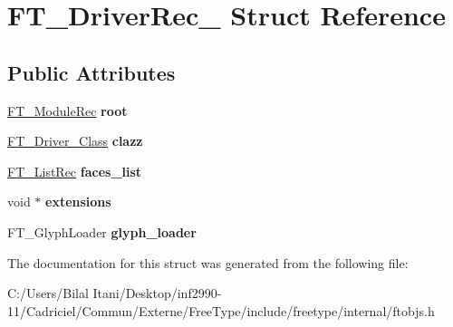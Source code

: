 \hypertarget{struct_f_t___driver_rec__}{}\section{F\+T\+\_\+\+Driver\+Rec\+\_\+ Struct Reference}
\label{struct_f_t___driver_rec__}
\subsection*{Public Attributes}
\begin{DoxyCompactItemize}
\item 
\hyperlink{struct_f_t___module_rec__}{F\+T\+\_\+\+Module\+Rec} {\bfseries root}\hypertarget{struct_f_t___driver_rec___a8451ceb25c76794fb47e81f477c8222d}{}\label{struct_f_t___driver_rec___a8451ceb25c76794fb47e81f477c8222d}

\item 
\hyperlink{struct_f_t___driver___class_rec__}{F\+T\+\_\+\+Driver\+\_\+\+Class} {\bfseries clazz}\hypertarget{struct_f_t___driver_rec___a3111153608e5abeb093ed5eb7fef5aec}{}\label{struct_f_t___driver_rec___a3111153608e5abeb093ed5eb7fef5aec}

\item 
\hyperlink{struct_f_t___list_rec__}{F\+T\+\_\+\+List\+Rec} {\bfseries faces\+\_\+list}\hypertarget{struct_f_t___driver_rec___a2602170e3ecde21a764dc32417aaa002}{}\label{struct_f_t___driver_rec___a2602170e3ecde21a764dc32417aaa002}

\item 
void $\ast$ {\bfseries extensions}\hypertarget{struct_f_t___driver_rec___ad2f1c1a800723dc887dcbc7ce78203d8}{}\label{struct_f_t___driver_rec___ad2f1c1a800723dc887dcbc7ce78203d8}

\item 
F\+T\+\_\+\+Glyph\+Loader {\bfseries glyph\+\_\+loader}\hypertarget{struct_f_t___driver_rec___ac28e7adbc14ee82c2b7710d0ee5541e2}{}\label{struct_f_t___driver_rec___ac28e7adbc14ee82c2b7710d0ee5541e2}

\end{DoxyCompactItemize}


The documentation for this struct was generated from the following file\+:\begin{DoxyCompactItemize}
\item 
C\+:/\+Users/\+Bilal Itani/\+Desktop/inf2990-\/11/\+Cadriciel/\+Commun/\+Externe/\+Free\+Type/include/freetype/internal/ftobjs.\+h\end{DoxyCompactItemize}

